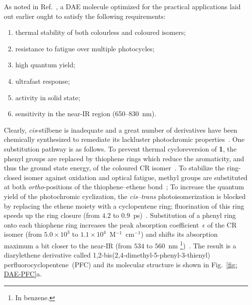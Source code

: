 As noted in Ref.~\cite{Irie2014},
a DAE molecule optimized for the practical applications laid out earlier ought to satisfy
the following requirements:
%
\begin{enumerate}
  \item thermal stability of both colourless and coloured isomers;
  \item resistance to fatigue over multiple photocycles;
  \item high quantum yield;
  \item ultrafast response;
  \item activity in solid state;
  \item sensitivity in the near-IR region (650--830~nm).
\end{enumerate}
%
Clearly, \textit{cis}-stilbene is inadequate and a great number of derivatives
have been chemically synthesized to remediate its lackluster photochromic properties~\cite{Szaloki2013}.
One substitution pathway is as follows.
To prevent thermal cycloreversion of \textbf{1}, the phenyl groups are replaced by
thiophene rings which reduce the aromaticity, and thus the ground state energy,
of the coloured CR isomer~\cite{Irie1988, Irie1989}.
%
To stabilize the ring-closed isomer against oxidation and optical fatigue,
methyl groups are substituted at both \textit{ortho}-positions
of the thiophene--ethene bond~\cite{Irie1999, Higashiguchi2000};
%
To increase the quantum yield of the photochromic cyclization,
the \textit{cis}--\textit{trans} photoisomerization is blocked
by replacing the ethene moiety with a cyclopentene ring;
fluorination of this ring speeds up the ring closure (from $4.2$ to $0.9$~ps)~\cite{Hania2005}.
%
Substitution of a phenyl ring onto each thiophene ring increases
the peak absorption coefficient~$\epsilon$ of the CR isomer
(from $5.0 \times 10^3$ to $1.1 \times 10^4$~M$^{-1}$~cm$^{-1}$)
and shifts its absorption maximum a bit closer to the near-IR (from $534$ to $560$~nm%
\footnote{In benzene.})~\cite{Irie2014}.
The result is a diarylethene derivative called
1,2-bis(2,4-dimethyl-5-phenyl-3-thienyl) perfluorocyclopentene~(PFC)
and its molecular structure is shown in Fig.~\ref{fig: DAE-PFC}a.


